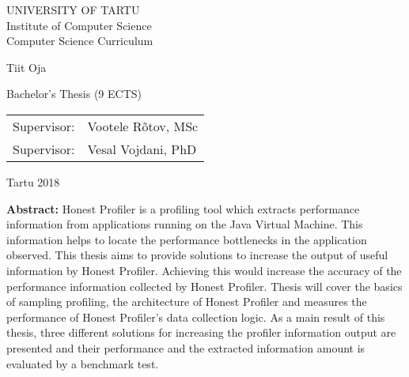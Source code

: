 \documentclass{style/thesis}
\begin{document}
\thispagestyle{empty}
\begin{center}

\large
UNIVERSITY OF TARTU\\[2mm]
Institute of Computer Science\\
Computer Science Curriculum\\[2mm]

\vspace{25mm}

\Large Tiit Oja

\vspace{4mm}

\huge \articleName

\vspace{20mm}

\Large Bachelor's Thesis (9 ECTS)

\end{center}

\vspace{2mm}

\begin{flushright}
 {
 \setlength{\extrarowheight}{5pt}
 \begin{tabular}{r l} 
  \sffamily Supervisor: & \sffamily Vootele Rõtov, MSc \\
  \sffamily Supervisor: & \sffamily Vesal Vojdani, PhD
 \end{tabular}
 }
\end{flushright}

\vfill
\centerline{Tartu 2018}



\pagebreak

\noindent\textbf{\large \articleName}
\vspace*{0mm}

\textbf{Abstract:} Honest Profiler is a profiling tool which extracts performance information from applications running on the Java Virtual Machine. This information helps to locate the performance bottlenecks in the application observed. This thesis aims to provide solutions to increase the output of useful information by Honest Profiler. Achieving this would increase the accuracy of the performance information collected by Honest Profiler. Thesis will cover the basics of sampling profiling, the architecture of Honest Profiler and measures the performance of Honest Profiler's data collection logic. As a main result of this thesis, three different solutions for increasing the profiler information output are presented and their performance and the extracted information amount is evaluated by a benchmark test.
  
\end{document}
